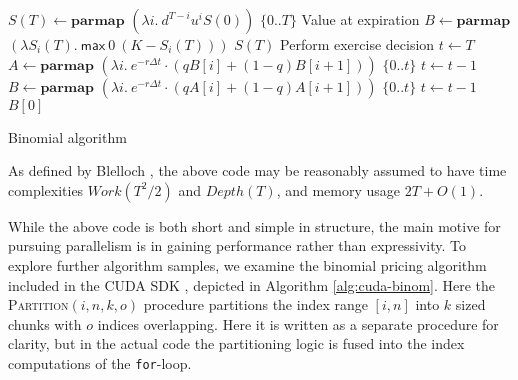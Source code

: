 \begin{algorithm}

\begin{algorithmic}
  \State $S(T) \gets \mathbf{parmap}$ $(\lambda i.\ d^{T-i}u^{i}S(0))$ $\{0..T\}$ \Comment Value at expiration
  \State $B \gets \mathbf{parmap}$ $(\lambda S_i(T).\ \mathsf{max}\ 0\ (K-S_i(T)))$ $S(T)$ \Comment Perform exercise decision
  \State $t \gets T$
    \State $A \gets \mathbf{parmap}$ $(\lambda i.\ e^{-r\Delta t} \cdot (qB[i] + (1-q)B[i+1]))$ $\{0..t\}$
    \State $t \gets t-1$
    \State $B \gets \mathbf{parmap}$ $(\lambda i.\ e^{-r\Delta t} \cdot (qA[i] + (1-q)A[i+1]))$ $\{0..t\}$
    \State $t \gets t-1$
  \EndWhile
  \State \Return $B[0]$
\EndFunction
\end{algorithmic}

  \caption{Binomial algorithm}
  \label{alg:binomial-algorithm}
\end{algorithm}

As defined by Blelloch \cite{blelloch1996programming}, the above code
may be reasonably assumed to have time complexities $Work(T^2/2)$ and
$Depth(T)$, and memory usage $2T + O(1)$.

While the above code is both short and simple in structure, the main motive for
pursuing parallelism is in gaining performance rather than expressivity.  To
explore further algorithm samples, we examine the binomial pricing algorithm
included in the CUDA SDK \cite{CUDAbinomial}, depicted in Algorithm
\ref{alg:cuda-binom}. Here the \textsc{Partition}$(i,n,k,o)$ procedure
partitions the index range $[i,n]$ into $k$ sized chunks with $o$ indices
overlapping. Here it is written as a separate procedure for clarity, but in the
actual code the partitioning logic is fused into the index computations of the
\lstinline{for}-loop.

